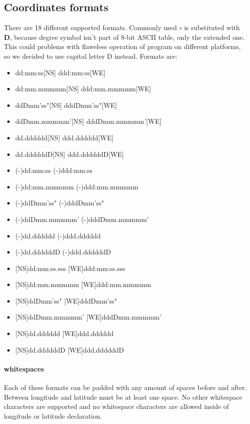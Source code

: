 \documentclass[12pt,titlepage]{article}
\begin{document}
\subsection{Coordinates formats}
There are 18 different supported formats. Commonly used $\circ$ is substituted with \textbf{D}, 
because degree symbol isn't part of 8-bit ASCII table, only the extended one. This could problems
with flaweless operation of program on different platforms, so we decided to use capital letter D 
instead.
Formats are:
\begin{itemize}
\item{dd:mm:ss[NS] ddd:mm:ss[WE] }
\item{dd:mm.mmmmm[NS] ddd:mm.mmmmm[WE]}
\item{ddDmm'ss"[NS] dddDmm'ss"[WE]}
\item{ddDmm.mmmmm'[NS] dddDmm.mmmmm'[WE]}
\item{dd.dddddd[NS] ddd.dddddd[WE]}
\item{dd.ddddddD[NS] ddd.ddddddD[WE]}

\item{(-)dd:mm:ss (-)ddd:mm:ss}
\item{(-)dd:mm.mmmmm (-)ddd:mm.mmmmm}
\item{(-)ddDmm'ss" (-)dddDmm'ss"}
\item{(-)ddDmm.mmmmm' (-)dddDmm.mmmmm'}
\item{(-)dd.dddddd (-)ddd.dddddd}
\item{(-)dd.ddddddD (-)ddd.ddddddD}

\item{[NS]dd:mm:ss.sss [WE]ddd:mm:ss.sss}
\item{[NS]dd:mm.mmmmm [WE]ddd:mm.mmmmm}
\item{[NS]ddDmm'ss" [WE]dddDmm'ss"}
\item{[NS]ddDmm.mmmmm' [WE]dddDmm.mmmmm'}
\item{[NS]dd.dddddd [WE]ddd.dddddd}
\item{[NS]dd.ddddddD [WE]ddd.ddddddD}
\end{itemize}

\paragraph{whitespaces}
Each of these formats can be padded with any amount of spaces before and after.  
Between longitude and latitude must be at least one space. No other whitespace characters are 
supported and no whitespace characters are allowed inside of longitude or latitude declaration.
\end{document}
